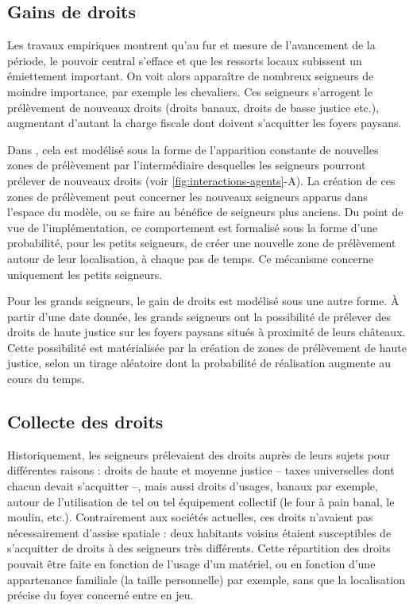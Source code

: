 \subsection{Gains de droits}

Les travaux empiriques montrent qu'au fur et mesure de l'avancement de la période, le pouvoir central s'efface et que les ressorts locaux subissent un émiettement important.
On voit alors apparaître de nombreux seigneurs de moindre importance, par exemple les chevaliers.
Ces seigneurs s'arrogent le prélèvement de nouveaux droits (droits banaux, droits de basse justice etc.), augmentant d'autant la charge fiscale dont doivent s'acquitter les foyers paysans.


\begin{tcolorbox}[breakable,left=0pt,right=0pt,top=0pt,bottom=0pt,
	colback=gray!15,colframe=gray!15,width=\dimexpr\textwidth\relax, 
	enlarge left by=0mm, boxsep=5pt,arc=0pt,outer arc=0pt,parbox=false]
Dans \simfeodal{}, cela est modélisé sous la forme de l'apparition constante de nouvelles zones de prélèvement par l'intermédiaire desquelles les seigneurs pourront prélever de nouveaux droits (voir \cref{fig:interactions-agents}-A).
La création de ces zones de prélèvement peut concerner les nouveaux seigneurs apparus dans l'espace du modèle, ou se faire au bénéfice de seigneurs plus anciens.
Du point de vue de l'implémentation, ce comportement est formalisé sous la forme d'une probabilité, pour les petits seigneurs, de créer une nouvelle zone de prélèvement autour de leur localisation, à chaque pas de temps.
Ce mécanisme concerne uniquement les petits seigneurs.

Pour les grands seigneurs, le gain de droits est modélisé sous une autre forme.
À partir d'une date donnée, les grands seigneurs ont la possibilité de prélever des droits de haute justice sur les foyers paysans situés à proximité de leurs châteaux.
Cette possibilité est matérialisée par la création de zones de prélèvement de haute justice, selon un tirage aléatoire dont la probabilité de réalisation augmente au cours du temps.
\end{tcolorbox}

\subsection{Collecte des droits}

Historiquement, les seigneurs prélevaient des droits auprès de leurs sujets pour différentes raisons : droits de haute et moyenne justice -- taxes universelles dont chacun devait s'acquitter --, mais aussi droits d'usages, banaux par exemple, autour de l'utilisation de tel ou tel équipement collectif (le four à pain banal, le moulin, etc.).
Contrairement aux sociétés actuelles, ces droits n'avaient pas nécessairement d'assise spatiale : deux habitants voisins étaient susceptibles de s'acquitter de droits à des seigneurs très différents.
Cette répartition des droits pouvait être faite en fonction de l'usage d'un matériel, ou en fonction d'une appartenance familiale (la \og taille\fg{} personnelle) par exemple, sans que la localisation précise du foyer concerné entre en jeu.

